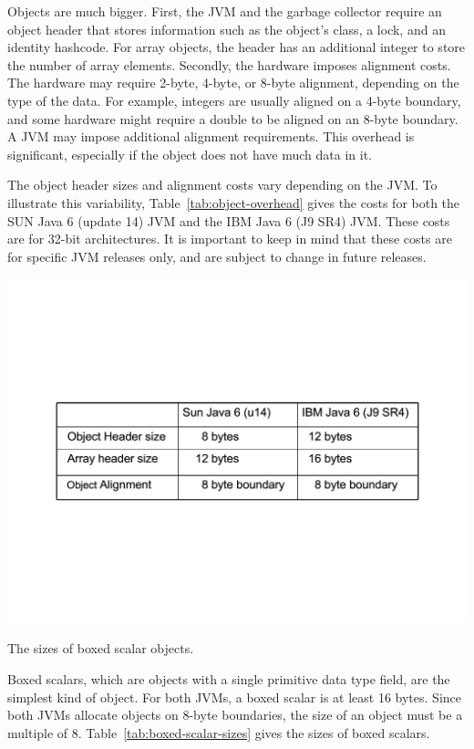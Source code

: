 \documentclass{book}
\theoremstyle{definition}
\begin{document}
Objects are much bigger. First, the JVM and the garbage collector require an object header that stores information such as the object's class, a lock, and an identity hashcode. For array objects, the header has an additional integer to store the number of array elements. Secondly, the hardware imposes alignment costs. The hardware may require 2-byte, 4-byte, or 8-byte alignment, depending on the type of the data. For example, integers are usually aligned on a 4-byte boundary, and some hardware might require a double to be aligned on an 8-byte boundary. A JVM may impose additional alignment requirements. This overhead is significant, especially if the object does not have much data in it.

The object header sizes and alignment costs vary depending on the JVM. To illustrate this variability, Table~\ref{tab:object-overhead} gives the costs for both the SUN Java 6 (update 14) JVM and the IBM Java 6 (J9 SR4) JVM. These costs are for 32-bit architectures. It is important to keep in mind that these costs are for specific JVM releases only, and are subject to change in future releases.
\begin{table}
  \centering
 \includegraphics[width=.70\textwidth]{Figures/chapter4/object-overhead.pdf}
  \caption{The sizes of boxed scalar objects.}
  \label{tab:object-overhead}
\end{table} 
 
Boxed scalars, which are objects with a single primitive data type field, are the simplest kind of  object. For both JVMs, a boxed scalar is at least 16 bytes. Since both JVMs allocate objects on 8-byte boundaries, the size of an object must be a multiple of 8. Table~\ref{tab:boxed-scalar-sizes} gives the sizes of boxed scalars.
\end{document}
